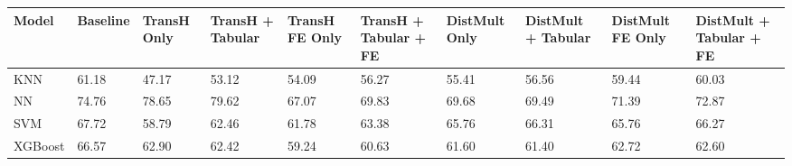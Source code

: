 \begin{tabular}{llllllllll}
\toprule
Model & Baseline & TransH Only & TransH + Tabular & TransH FE Only & TransH + Tabular + FE & DistMult Only & DistMult + Tabular & DistMult FE Only & DistMult + Tabular + FE \\
\midrule
KNN & 61.18 & 47.17 & 53.12 & 54.09 & 56.27 & 55.41 & 56.56 & 59.44 & 60.03 \\
NN & 74.76 & 78.65 & 79.62 & 67.07 & 69.83 & 69.68 & 69.49 & 71.39 & 72.87 \\
SVM & 67.72 & 58.79 & 62.46 & 61.78 & 63.38 & 65.76 & 66.31 & 65.76 & 66.27 \\
XGBoost & 66.57 & 62.90 & 62.42 & 59.24 & 60.63 & 61.60 & 61.40 & 62.72 & 62.60 \\
\bottomrule
\end{tabular}
